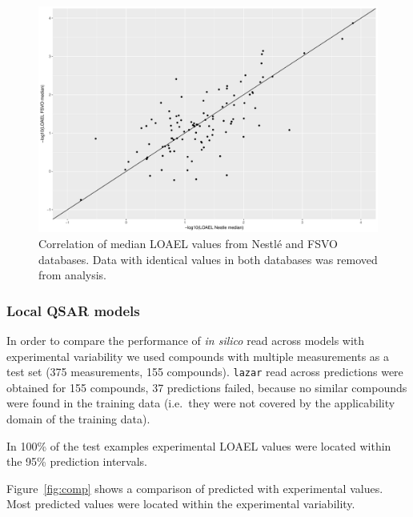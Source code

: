 \documentclass[]{achemso}
\begin{document}
\begin{figure}
\centering
\includegraphics{figures/median-correlation.pdf}
\caption{Correlation of median LOAEL values from Nestlé and FSVO
databases. Data with identical values in both databases was removed from
analysis.}\label{fig:datacorr}
\end{figure}

\subsubsection{Local QSAR models}\label{local-qsar-models}

In order to compare the performance of \emph{in silico} read across
models with experimental variability we used compounds with multiple
measurements as a test set (375 measurements, 155 compounds).
\texttt{lazar} read across predictions were obtained for 155 compounds,
37 predictions failed, because no similar compounds were found in the
training data (i.e.~they were not covered by the applicability domain of
the training data).

In 100\% of the test examples experimental LOAEL values were located
within the 95\% prediction intervals.

Figure~\ref{fig:comp} shows a comparison of predicted with experimental
values. Most predicted values were located within the experimental
variability.
\end{document}
